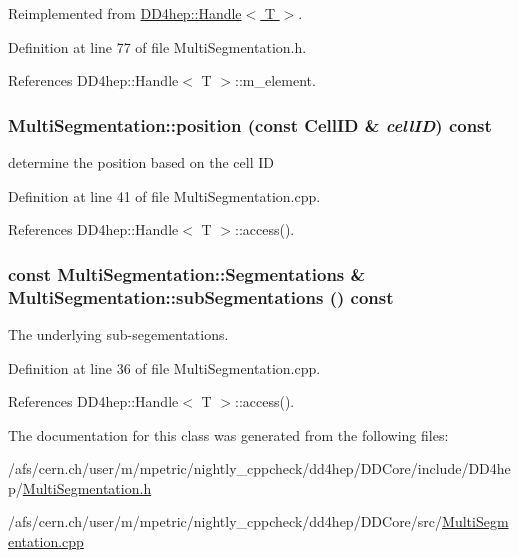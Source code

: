 Reimplemented from \hyperlink{class_d_d4hep_1_1_handle_a618470283b3a2cc5ed0545fec90dc759}{DD4hep::Handle$<$ T $>$}.

Definition at line 77 of file MultiSegmentation.h.

References DD4hep::Handle$<$ T $>$::m\_\-element.\hypertarget{class_d_d4hep_1_1_geometry_1_1_multi_segmentation_a3d35ba15f395f90d54d33d39b82587b9}{
\subsubsection[{position}]{ MultiSegmentation::position (const CellID \& {\em cellID}) const}}
\label{class_d_d4hep_1_1_geometry_1_1_multi_segmentation_a3d35ba15f395f90d54d33d39b82587b9}


determine the position based on the cell ID 

Definition at line 41 of file MultiSegmentation.cpp.

References DD4hep::Handle$<$ T $>$::access().\hypertarget{class_d_d4hep_1_1_geometry_1_1_multi_segmentation_a8a9d4ff9ae316833f1f8467152b7439a}{
\subsubsection[{subSegmentations}]{\setlength{\rightskip}{0pt plus 5cm}const {\bf MultiSegmentation::Segmentations} \& MultiSegmentation::subSegmentations () const}}
\label{class_d_d4hep_1_1_geometry_1_1_multi_segmentation_a8a9d4ff9ae316833f1f8467152b7439a}


The underlying sub-\/segementations. 

Definition at line 36 of file MultiSegmentation.cpp.

References DD4hep::Handle$<$ T $>$::access().

The documentation for this class was generated from the following files:\begin{DoxyCompactItemize}
\item 
/afs/cern.ch/user/m/mpetric/nightly\_\-cppcheck/dd4hep/DDCore/include/DD4hep/\hyperlink{_d_d_core_2include_2_d_d4hep_2_multi_segmentation_8h}{MultiSegmentation.h}\item 
/afs/cern.ch/user/m/mpetric/nightly\_\-cppcheck/dd4hep/DDCore/src/\hyperlink{_d_d_core_2src_2_multi_segmentation_8cpp}{MultiSegmentation.cpp}\end{DoxyCompactItemize}
